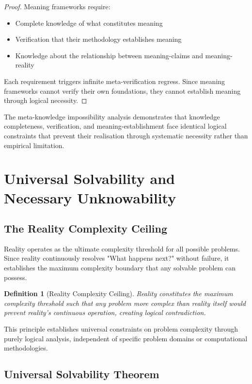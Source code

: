 \documentclass[12pt,a4paper]{article}
\newtheorem{definition}[theorem]{Definition}
\begin{document}
\begin{proof}
Meaning frameworks require:
\begin{itemize}
\item Complete knowledge of what constitutes meaning
\item Verification that their methodology establishes meaning
\item Knowledge about the relationship between meaning-claims and meaning-reality
\end{itemize}

Each requirement triggers infinite meta-verification regress. Since meaning frameworks cannot verify their own foundations, they cannot establish meaning through logical necessity.
\end{proof}

The meta-knowledge impossibility analysis demonstrates that knowledge completeness, verification, and meaning-establishment face identical logical constraints that prevent their realisation through systematic necessity rather than empirical limitation.

\section{Universal Solvability and Necessary Unknowability}

\subsection{The Reality Complexity Ceiling}

Reality operates as the ultimate complexity threshold for all possible problems. Since reality continuously resolves "What happens next?" without failure, it establishes the maximum complexity boundary that any solvable problem can possess.

\begin{definition}[Reality Complexity Ceiling]
Reality constitutes the maximum complexity threshold such that any problem more complex than reality itself would prevent reality's continuous operation, creating logical contradiction.
\end{definition}

This principle establishes universal constraints on problem complexity through purely logical analysis, independent of specific problem domains or computational methodologies.

\subsection{Universal Solvability Theorem}
\end{document}
